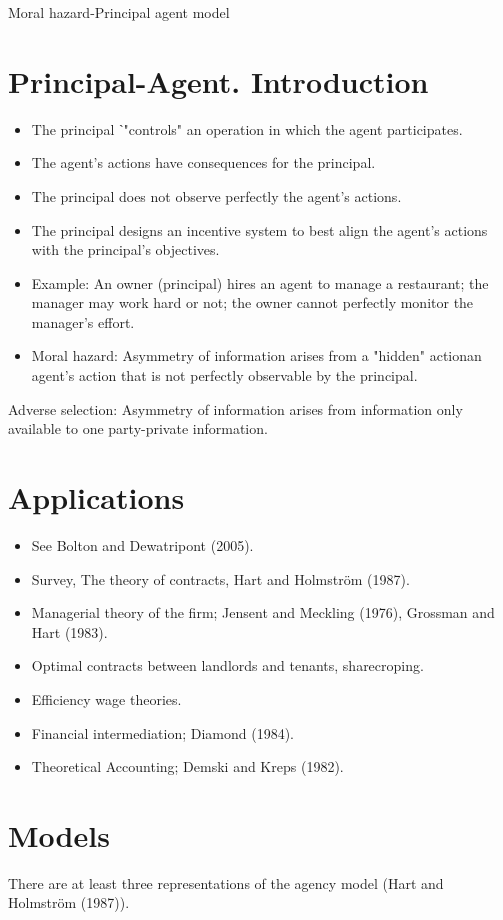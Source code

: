 \documentclass[10pt]{article}
\begin{document}
Moral hazard-Principal agent model

\section*{Principal-Agent. Introduction}
\begin{itemize}
  \item The principal ˋ"controls" an operation in which the agent participates.
  \item The agent's actions have consequences for the principal.
  \item The principal does not observe perfectly the agent's actions.
  \item The principal designs an incentive system to best align the agent's actions with the principal's objectives.
  \item Example: An owner (principal) hires an agent to manage a restaurant; the manager may work hard or not; the owner cannot perfectly monitor the manager's effort.
  \item Moral hazard: Asymmetry of information arises from a "hidden" actionan agent's action that is not perfectly observable by the principal.
\end{itemize}

Adverse selection: Asymmetry of information arises from information only available to one party-private information.

\section*{Applications}
\begin{itemize}
  \item See Bolton and Dewatripont (2005).
  \item Survey, The theory of contracts, Hart and Holmström (1987).
  \item Managerial theory of the firm; Jensent and Meckling (1976), Grossman and Hart (1983).
  \item Optimal contracts between landlords and tenants, sharecroping.
  \item Efficiency wage theories.
  \item Financial intermediation; Diamond (1984).
  \item Theoretical Accounting; Demski and Kreps (1982).
\end{itemize}

\section*{Models}
There are at least three representations of the agency model (Hart and Holmström (1987)).
\end{document}
